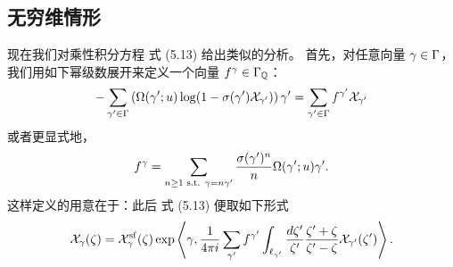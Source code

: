 \providecommand{\eps}{\epsilon}

\subsection*{无穷维情形}

现在我们对乘性积分方程 式 (5.13) 给出类似的分析。%
首先，对任意向量 $\gamma \in \Gamma$，我们用如下幂级数展开来定义一个向量 $f^\gamma \in \Gamma_{\mathbb{Q}}$：
\begin{equation}
- \sum_{\gamma' \in \Gamma} \left( \Omega(\gamma';u)
\log (1- \sigma(\gamma')
\mathcal{X}_{\gamma'} ) \right) \gamma' = \sum_{\gamma' \in \Gamma} f^{\gamma'} \mathcal{X}_{\gamma'}
\end{equation}
或者更显式地，
\begin{equation}
f^\gamma = \sum_{n \ge 1 \text{ s.t. } \gamma = n \gamma'} \frac{\sigma(\gamma')^n}{n} \Omega(\gamma';u) \gamma'.
\end{equation}
这样定义的用意在于：此后 式 (5.13) 便取如下形式%
\begin{equation} \label{eq:X-integral-mult-std}
\mathcal{X}_\gamma(\zeta) = \mathcal{X}^{\mathrm{sf}}_\gamma(\zeta) \exp \left\langle \gamma,
\frac{1}{4 \pi i} \sum_{\gamma'} f^{\gamma'} \int_{\ell_{\gamma'}} \frac{d\zeta'}{\zeta'} \frac{\zeta' +
\zeta}{\zeta' - \zeta} \mathcal{X}_{\gamma'}(\zeta') \right\rangle.
\end{equation}

